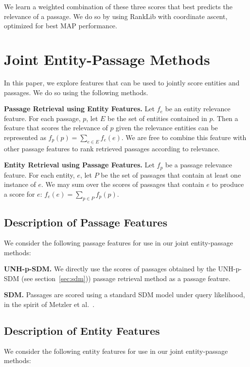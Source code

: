 \documentclass{article}
\begin{document}
We learn a weighted combination of these three scores that best predicts the relevance of a passage.  We do so by using RankLib with coordinate ascent, optimized for best MAP performance. 


\section{Joint Entity-Passage Methods}\label{sec:joint}


In this paper, we explore features that can be used to jointly score entities and passages. We do so using the following methods.

\textbf{Passage Retrieval using Entity Features.} Let $f_e$ be an entity relevance feature.
For each passage, $p$, let $E$ be the set of entities contained in $p$.
Then a feature that scores the relevance of $p$ given the relevance entities can be represented as $f_p(p) = \sum_{e \in E}{f_e(e)}$. 
We are free to combine this feature with other passage features to rank retrieved passages according to relevance.

\textbf{Entity Retrieval using Passage Features.} Let $f_p$ be a passage relevance feature.
For each entity, $e$, let $P$ be the set of passages that contain at least one instance of $e$.
We may sum over the scores of passages that contain $e$ to produce a score for $e$: $f_e(e) = \sum_{p \in P}{f_p(p)}$.

\subsection{Description of Passage Features}\label{sec:jointpassage}
We consider the following passage features for use in our joint entity-passage methods:

\textbf{UNH-p-SDM.} We directly use the scores of passages obtained by the UNH-p-SDM (see section~\ref{sec:sdm})) passage retrieval method as a passage feature. 

\textbf{SDM.} Passages are scored using a standard SDM model under query likelihood, in the spirit of Metzler et al.\ \cite{metzler2005markov}.


\subsection{Description of Entity Features}\label{sec:jointentity}
We consider the following entity features for use in our joint entity-passage methods:
\end{document}
